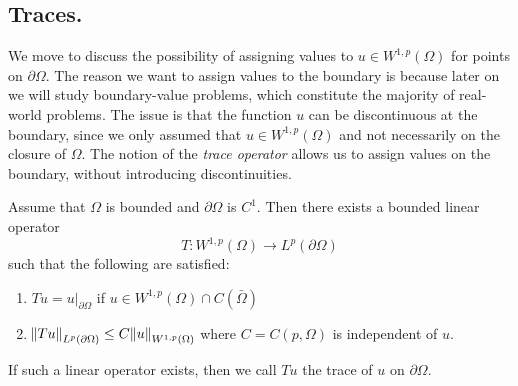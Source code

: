 \documentclass[10pt]{article}
\begin{document}
\subsection{Traces.}
We move to discuss the possibility of assigning values to $u \in W^{1,p}(\Omega)$ for points on $\partial \Omega$. The reason we want to assign values to the boundary is because later on we will study boundary-value problems, which constitute the majority of real-world problems. The issue is that the function $u$ can be discontinuous at the boundary, since we only assumed that $u \in W^{1,p}(\Omega)$ and not necessarily on the closure of $\Omega$. The notion of the \textit{trace operator} allows us to assign values on the boundary, without introducing discontinuities. 
\begin{theorem}
	Assume that $\Omega$ is bounded and $\partial \Omega$ is $C^1$. Then there exists a bounded linear operator 
	\begin{equation*}
		\displaystyle T: W^{1,p}(\Omega) \to L^p(\partial \Omega)
	\end{equation*}
	such that the following are satisfied:
	\begin{enumerate}
		\item $Tu = u|_{\partial \Omega}$ if $u \in W^{1,p}(\Omega) \cap C(\bar{\Omega})$
		\item $\norm{Tu}_{L^p(\partial \Omega)} \leq C \norm{u}_{W^{1,p}(\Omega)}$ where $C = C(p,\Omega)$ is independent of $u$.
	\end{enumerate}
	If such a linear operator exists, then we call $Tu$ the trace of $u$ on $\partial \Omega$. 
\end{theorem}
\end{document}
